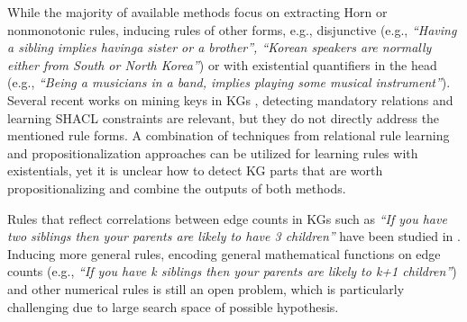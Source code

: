 While the majority of available methods focus on extracting Horn or nonmonotonic rules, inducing rules of other forms, e.g., %
disjunctive 
(e.g., \emph{``Having a sibling implies havinga sister or a brother'', ``Korean speakers are normally either from South or North Korea''})
 or with existential quantifiers in the head (e.g., \emph{``Being a musicians in a band, implies  playing some musical instrument''}).
Several recent works on mining keys in KGs \cite{vickey,DBLP:conf/www/LajusS18}, detecting mandatory relations \cite{DBLP:conf/www/LajusS18} and learning SHACL constraints \cite{shacl} are relevant, but they do not directly address the mentioned rule forms. A combination of techniques from relational rule learning \cite{DBLP:books/daglib/0021868} and propositionalization approaches \cite{propos} can be utilized for learning rules with existentials, yet it is unclear how to detect KG parts that are worth propositionalizing and combine the outputs of both methods.  %

Rules that reflect correlations between edge counts in KGs such as \emph{``If you have two siblings then your parents are likely to have 3 children''} have been studied in \cite{carl}. Inducing more general rules, encoding general mathematical functions on edge counts (e.g.,  \emph{``If you have k siblings then your parents are likely to k+1 children''}) and other numerical rules is still an open problem, which is particularly challenging due to large search space of possible hypothesis.

